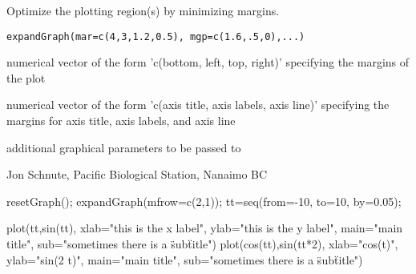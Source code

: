 \documentclass[letterpaper]{book}
\begin{document}
\begin{Description}\relax
Optimize the plotting region(s) by minimizing margins.
\end{Description}
\begin{Usage}
\begin{verbatim}
expandGraph(mar=c(4,3,1.2,0.5), mgp=c(1.6,.5,0),...)
\end{verbatim}
\end{Usage}
\begin{Arguments}
\begin{ldescription}
\item[\code{mar}] numerical vector of the form 'c(bottom, left, top, right)'
specifying the margins of the plot
\item[\code{mgp}] numerical vector of the form 'c(axis title, axis labels, axis line)'
specifying the margins for axis title, axis labels, and axis line
\item[\code{...}] additional graphical parameters to be passed to 
\end{ldescription}
\end{Arguments}
\begin{Author}\relax
Jon Schnute, Pacific Biological Station, Nanaimo BC
\end{Author}
\begin{SeeAlso}\relax
{}
\end{SeeAlso}
\begin{Examples}
\begin{ExampleCode}
resetGraph(); expandGraph(mfrow=c(2,1));
tt=seq(from=-10, to=10, by=0.05);

plot(tt,sin(tt), xlab="this is the x label",  ylab="this is the y label", 
        main="main title", sub="sometimes there is a \"sub\" title")
plot(cos(tt),sin(tt*2), xlab="cos(t)", ylab="sin(2 t)", main="main title", 
        sub="sometimes there is a \"sub\" title")
\end{ExampleCode}
\end{Examples}
\end{document}
